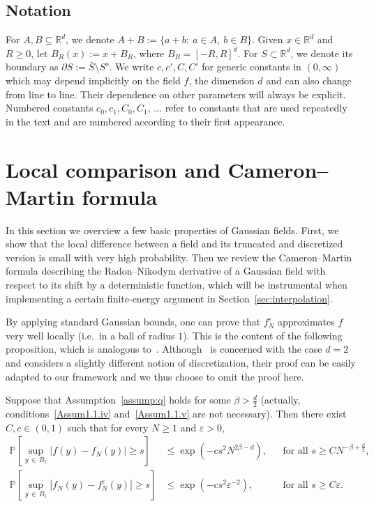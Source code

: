 \documentclass[AHL,Unicode,longabstracts,published]{cedram}
\renewcommand{\P}{\mathbb{P}}
\newcommand{\R}{\mathbb{R}}
\newcommand{\R}{\mathbb{R}}
\begin{document}
\subsection*{Notation}
For $A,B\subseteq\R^d$, we denote $A+B:=\{a+b:~a\in A,~b\in B\}$. Given $x\in \R^d$ and $R\geq 0$, let $B_R(x):= x + B_R$, where $B_R=[-R,R]^d$. For $S\subset \R^d$, we denote its boundary as $\partial S:=\bar{S}\setminus S^o$. We write $c,c',C,C'$ for generic constants in $(0,\infty)$ which may depend implicitly on the field $f$, the dimension $d$ and can also change from line to line. Their dependence on other parameters will always be explicit. Numbered constants $c_0,c_1,C_0,C_1,\,\dots$ refer to constants that are used repeatedly in the text and are numbered according to their first appearance.


\section{Local comparison and Cameron--Martin formula}

In this section we overview a few basic properties of Gaussian fields. First, we show that the local difference between a field and its truncated and discretized version is small with very high probability. Then we review the Cameron--Martin formula describing the Radon--Nikodym derivative of a Gaussian field with respect to its shift by a deterministic function, which will be instrumental when implementing a certain finite-energy argument in Section~\ref{sec:interpolation}.

By applying standard Gaussian bounds, one can prove that $f_N^\varepsilon$ approximates $f$ very well locally (i.e.~in a ball of radius $1$). This is the content of the following proposition, which is analogous to~\cite[Proposition~3.11]{MV}. Although~\cite{MV} is concerned with the case $d=2$ and considers a slightly different notion of discretization, their proof can be easily adapted to our framework and we thus choose to omit the proof here.

\begin{prop}\label{prop:local_comp}
Suppose that Assumption~\ref{assump:q} holds for some $\beta>\frac{d}{2}$ (actually, conditions~\eqref{Assum1.1.iv} and~\eqref{Assum1.1.v} are not necessary). Then there exist $C,c\in(0,1)$ such that for every $N\geq1$ and $\varepsilon>0$,
\begin{align}
\P\left[\sup_{y\,\in\,B_1}\left|f(y)-f_N(y)\right| \geq s \right] &\leq \exp\left(-cs^2 N^{2\beta-d}\right), &&\text{for all } s\geq CN^{-\beta+\frac{d}{2}},\label{eq:local_comp_r}\\
\P\left[\sup_{y\,\in\,B_1}\left|f_N(y)-f_N^\varepsilon(y)\right|\geq s \right] &\leq \exp\left(-cs^2 \varepsilon^{-2}\right), &&\text{for all } s\geq C\varepsilon.\label{eq:local_comp_epsilon}
\end{align}
\end{prop}
\end{document}
